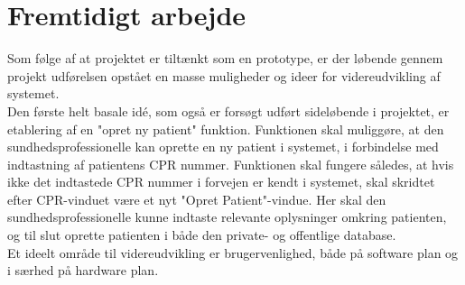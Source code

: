 \section{Fremtidigt arbejde}
Som følge af at projektet er tiltænkt som en prototype, er der løbende gennem projekt udførelsen opstået en masse muligheder og ideer for videreudvikling af systemet. \\
Den første helt basale idé, som også er forsøgt udført sideløbende i projektet, er etablering af en "opret ny patient" funktion. Funktionen skal muliggøre, at den sundhedsprofessionelle kan oprette en ny patient i systemet, i forbindelse med indtastning af patientens CPR nummer. Funktionen skal fungere således, at hvis ikke det indtastede CPR nummer i forvejen er kendt i systemet, skal skridtet efter CPR-vinduet være et nyt "Opret Patient"-vindue. Her skal den sundhedsprofessionelle kunne indtaste relevante oplysninger omkring patienten, og til slut oprette patienten i både den private- og offentlige database.\\
Et ideelt område til videreudvikling er brugervenlighed, både på software plan og i særhed på hardware plan.
